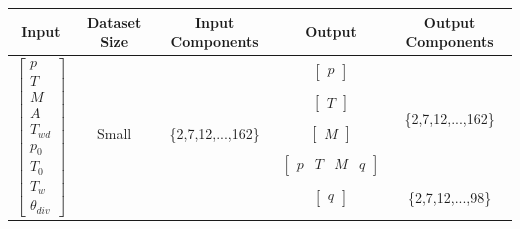\begin{table}[h!]
    \centering
    \begin{tabular}{c c c c c} 
     \toprule
     \textbf{Input} & \textbf{Dataset Size}  &\textbf{Input Components} &  \textbf{Output}  & \textbf{Output Components}\\ 
     \hline
     \hline
     \multirow{15}{*}{$\begin{bmatrix} p \\ T \\ M \\ A \\ T_{wd} \\ p_0 \\ T_0 \\ T_w \\ \theta_{div} \end{bmatrix}^{}$ } & \multirow{5}{*}{Small}  & \multirow{5}{*}{\{2,7,12,...,162\}} & $\begin{bmatrix} p \end{bmatrix}$    & \multirow{4}{*}{\{2,7,12,...,162\}} \\ 
                            & &                                     & $\begin{bmatrix} T \end{bmatrix}$ & \\ 
                            & &                                     & $\begin{bmatrix} M \end{bmatrix}$        & \\ 
                            & &                                     & $\begin{bmatrix} p & T & M & q \end{bmatrix}$  & \\ \cline{4-5}
                            & &                                     & $\begin{bmatrix} q \end{bmatrix}$   & \{2,7,12,...,98\} \\ \cline{2-5}
                        

\end{tabular}
\end{table}
